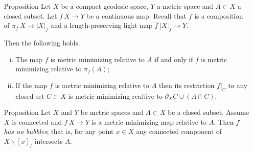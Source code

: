 \documentclass{article}
\begin{document}
\begin{thm}{Proposition}\label{prop:memicrit}
Let $X$ be a compact geodesic space, $Y$ a metric space 
and $A\subset X$ a closed subset.
Let $f\:X\to Y$ be a continuous map.
Recall that 
$f$ is a composition of $\pi_f\: X\to|X|_f$ and a length-preserving light map $\bar f\:|X|_f\to Y$.

Then the following holds.
\begin{enumerate}[(i)]
\item The map $f$ is metric minimizing relative to $A$
if and only if $\bar f$ is metric minimizing relative to $\pi_f(A)$;
\item\label{prop:memicrit:retriction} If the map $f$ is metric minimizing relative to $A$ then its restriction
$f|_C$ to any closed set $C\subset X$ is metric minimizing realtive to $\partial_X C\cup (A\cap C)$.
\end{enumerate}

\end{thm}




\begin{thm}{Proposition}\label{prop:point-complement}
Let $X$ and $Y$ be metric spaces and $A\subset X$ be a closed subset.
Assume $X$ is connected and $f\:X\to Y$ is a metric minimizing map relative to $A$.
Then $f$ \label{page:no-bubble}\emph{has no bubbles}; that is, for any point $x\in X$ any connected component of $X\backslash [x]_f$ intersects $A$.

\end{thm}
\end{document}

